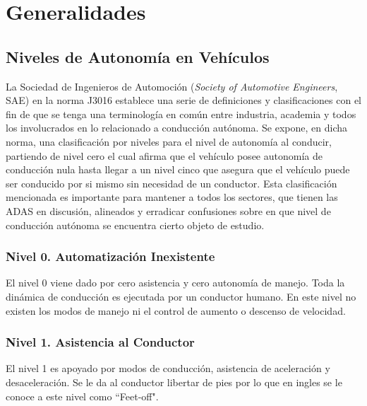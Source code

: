 





\section{Generalidades}
\subsection{Niveles de Autonomía en Vehículos}

La Sociedad de Ingenieros de Automoción (\textit{Society of Automotive Engineers}, SAE) en la norma J3016 establece una serie de definiciones y clasificaciones con el fin de que se tenga una terminología en común entre industria, academia y todos los involucrados en lo relacionado a conducción autónoma. Se expone, en dicha norma, una clasificación por niveles para el nivel de autonomía al conducir, partiendo de nivel cero el cual afirma que el vehículo posee autonomía de conducción nula hasta llegar a un nivel cinco que asegura que el vehículo puede ser conducido por si mismo sin necesidad de un conductor.
Esta clasificación mencionada es importante para mantener a todos los sectores, que tienen las ADAS en discusión, alineados y erradicar confusiones sobre en que nivel de conducción autónoma se encuentra cierto objeto de estudio\cite{SAE2016}. 


\subsubsection{Nivel 0. Automatización Inexistente}
\begin{myindentpar}{5cm}
El nivel 0 viene dado por cero asistencia y cero autonomía de manejo. Toda la dinámica de conducción es ejecutada por un conductor humano. En este nivel no existen los modos de manejo ni el control de aumento o descenso de velocidad.
\end{myindentpar}

\subsubsection{Nivel 1. Asistencia al Conductor}
\begin{myindentpar}{5cm}
 {El nivel 1 es apoyado por modos de conducción, asistencia de aceleración y desaceleración. Se le da al conductor libertar de pies por lo que en ingles se le conoce a este nivel como ``Feet-off".}
\end{myindentpar}

